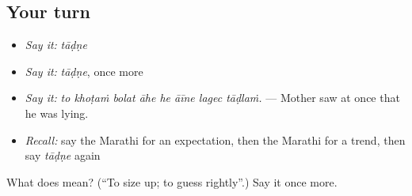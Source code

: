 \subsection*{Your turn}
\begin{itemize}
\raggedright
  \item \emph{Say it:} \emph{tāḍṇe}
  \item \emph{Say it:} \emph{tāḍṇe}, once more
  \item \emph{Say it:} \emph{to khoṭaṁ bolat āhe he āīne lagec tāḍlaṁ.} — Mother saw at once that he was lying.
  \item \emph{Recall:} say the Marathi for an expectation, then the Marathi for a trend, then say \emph{tāḍṇe} again
\end{itemize}

\begin{tcolorbox}[breakable,colback=teal!4,colframe=teal!35!black,title={Before you move on}]
What does  mean? (\textquotedblleft{}To size up; to guess rightly\textquotedblright{}.) Say it once more.
\end{tcolorbox}
